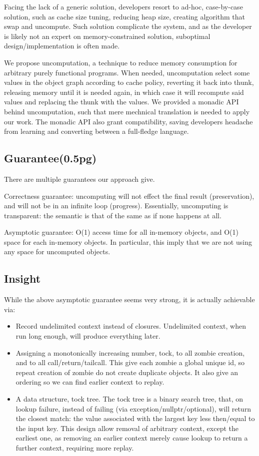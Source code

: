 Facing the lack of a generic solution, developers resort to ad-hoc, case-by-case solution, such as cache size tuning, reducing heap size, creating algorithm that swap and uncompute. Such solution complicate the system, and as the developer is likely not an expert on memory-constrained solution, suboptimal design/implementation is often made.

We propose uncomputation, a technique to reduce memory consumption for arbitrary purely functional programs. When needed, uncomputation select some values in the object graph according to cache policy, reverting it back into thunk, releasing memory until it is needed again, in which case it will recompute said values and replacing the thunk with the values. We provided a monadic API behind uncomputation, such that mere mechnical translation is needed to apply our work. The monadic API also grant compatibility, saving developers headache from learning and converting between a full-fledge language.

\subsection{Guarantee(0.5pg)}
There are multiple guarantees our approach give.

Correctness guarantee: uncomputing will not effect the final result (preservation), and will not be in an infinite loop (progress). Essentially, uncomputing is transparent: the semantic is that of the same as if none happens at all.

Asymptotic guarantee: O(1) access time for all in-memory objects, and O(1) space for each in-memory objects. In particular, this imply that we are not using any space for uncomputed objects.

\subsection{Insight}
While the above asymptotic guarantee seems very strong, it is actually achievable via:

\begin{itemize}
	\item Record undelimited context instead of closures. Undelimited context, when run long enough, will produce everything later.
	\item Assigning a monotonically increasing number, tock, to all zombie creation, and to all call/return/tailcall. This give each zombie a global unique id, so repeat creation of zombie do not create duplicate objects. It also give an ordering so we can find earlier context to replay.
	\item A data structure, tock tree. The tock tree is a binary search tree, that, on lookup failure, instead of failing (via exception/nullptr/optional), will return the closest match: the value associated with the largest key less then/equal to the input key. This design allow removal of arbitrary context, except the earliest one, as removing an earlier context merely cause lookup to return a further context, requiring more replay.
\end{itemize}

